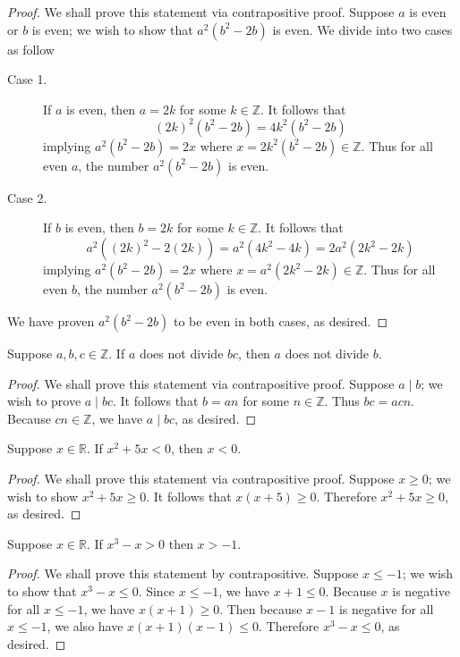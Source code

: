 \documentclass{exam}
\begin{document}
\begin{proof}
    We shall prove this statement via contrapositive proof. Suppose $a$ is even or $b$ is even; we wish to show that $a^2(b^2-2b)$ is even. We divide into two cases as follow
    \begin{description}
        \item[Case 1. ] If $a$ is even, then $a = 2k$ for some $k\in\mathbb Z$. It follows that \[
        (2k)^2(b^2-2b)=4k^2(b^2-2b)
        \]
        implying $a^2(b^2-2b) =2x$ where $x = 2k^2(b^2-2b) \in\mathbb Z$. Thus for all even $a$, the number $a^2(b^2-2b)$ is even.
        \item[Case 2. ] If $b$ is even, then $b = 2k$ for some $k\in\mathbb Z$. It follows that \[
        a^2((2k)^2-2(2k)) = a^2(4k^2-4k)=2a^2(2k^2-2k)
        \]
        implying $a^2(b^2-2b) = 2x$ where $x = a^2(2k^2-2k)\in\mathbb Z$. Thus for all even $b$, the number $a^2(b^2-2b)$ is even.
    \end{description}
    We have proven $a^2(b^2-2b)$ to be even in both cases, as desired.
\end{proof}

\begin{proposition}{5.4}
    Suppose $a,b,c\in\mathbb Z$. If $a$ does not divide $bc$, then $a$ does not divide $b$.
\end{proposition}

\begin{proof}
    We shall prove this statement via contrapositive proof. Suppose $a \mid b$; we wish to prove $a\mid bc$. It follows that $b = an$ for some $n\in\mathbb Z$. Thus $bc = acn$. Because $cn\in\mathbb Z$, we have $a\mid bc$, as desired.
\end{proof}

\begin{proposition}{5.5}
    Suppose $x\in\mathbb R$. If $x^2+5x<0$, then $x<0$.
\end{proposition}

\begin{proof}
    We shall prove this statement via contrapositive proof. Suppose $x \ge 0$; we wish to show $x^2+5x \ge 0$. It follows that $x(x+5) \ge 0$.  Therefore $x^2+5x\ge0$, as desired.
\end{proof}

\begin{proposition}{5.6}
    Suppose $x\in\mathbb R$. If $x^3-x>0$ then $x > -1$.
\end{proposition}

\begin{proof}
    We shall prove this statement by contrapositive. Suppose $x \le -1$; we wish to show that $x^3-x\le 0$. Since $x\le-1$, we have $x+1\le0$. Because $x$ is negative for all $x\le-1$, we have $x(x+1)\ge0$. Then because $x-1$ is negative for all $x\le-1$, we also have $x(x+1)(x-1)\le0$. Therefore $x^3-x\le0$, as desired.
\end{proof}
\end{document}
